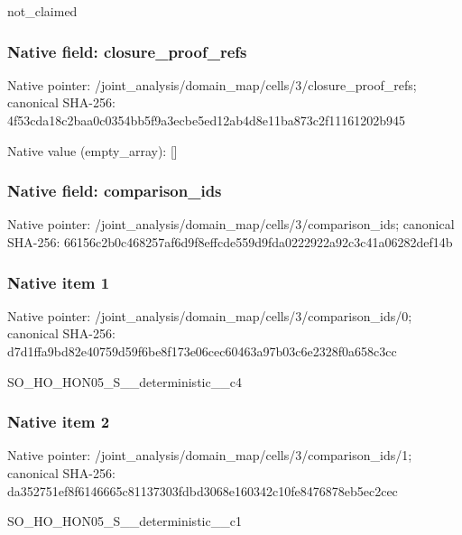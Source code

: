\documentclass[10pt,a4paper]{article}
\begin{document}
\begingroup\raggedright\sloppy not\_\allowbreak{}claimed\par\endgroup

\subsubsection{Native field: closure\_\allowbreak{}proof\_\allowbreak{}refs}
Native pointer: /joint\_\allowbreak{}analysis/domain\_\allowbreak{}map/cells/3/closure\_\allowbreak{}proof\_\allowbreak{}refs; canonical SHA-256: 4f53cda18c2baa0c0354bb5f9a3ecbe5ed12ab4d8e11ba873c2f11161202b945

Native value (empty\_\allowbreak{}array): []

\subsubsection{Native field: comparison\_\allowbreak{}ids}
Native pointer: /joint\_\allowbreak{}analysis/domain\_\allowbreak{}map/cells/3/comparison\_\allowbreak{}ids; canonical SHA-256: 66156c2b0c468257af6d9f8effcde559d9fda0222922a92c3c41a06282def14b

\subsubsection{Native item 1}
Native pointer: /joint\_\allowbreak{}analysis/domain\_\allowbreak{}map/cells/3/comparison\_\allowbreak{}ids/0; canonical SHA-256: d7d1ffa9bd82e40759d59f6be8f173e06cec60463a97b03c6e2328f0a658c3cc

\begingroup\raggedright\sloppy SO\_\allowbreak{}HO\_\allowbreak{}HON05\_\allowbreak{}S\_\allowbreak{}\_\allowbreak{}deterministic\_\allowbreak{}\_\allowbreak{}c4\par\endgroup

\subsubsection{Native item 2}
Native pointer: /joint\_\allowbreak{}analysis/domain\_\allowbreak{}map/cells/3/comparison\_\allowbreak{}ids/1; canonical SHA-256: da352751ef8f6146665c81137303fdbd3068e160342c10fe8476878eb5ec2cec

\begingroup\raggedright\sloppy SO\_\allowbreak{}HO\_\allowbreak{}HON05\_\allowbreak{}S\_\allowbreak{}\_\allowbreak{}deterministic\_\allowbreak{}\_\allowbreak{}c1\par\endgroup
\end{document}
